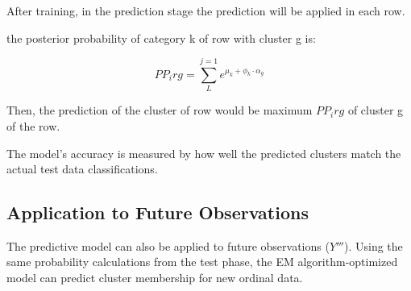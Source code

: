 \documentclass{article}
\begin{document}
After training, in the prediction stage the prediction will be applied in each row.

the posterior probability of category k of row with cluster g is:

\begin{equation}
PP_irg = \sum_{L}^{j=1} e^{\mu_k + \phi_k \cdot \alpha_g}
\end{equation}

Then, the prediction of the cluster of row would be maximum $PP_irg$ of cluster g of the row.

The model's accuracy is measured by how well the predicted clusters match the actual test data classifications.

\subsection{Application to Future Observations}

The predictive model can also be applied to future observations ($Y'''$). Using the same probability calculations from the test phase, the EM algorithm-optimized model can predict cluster membership for new ordinal data.



\end{document}
